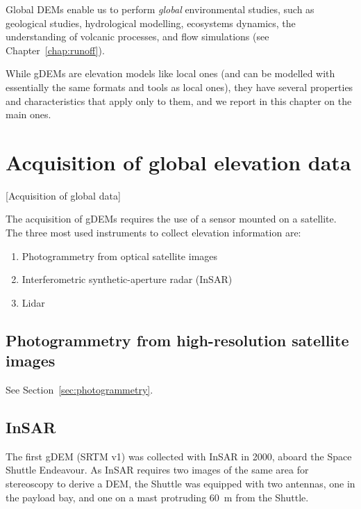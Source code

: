 %

Global DEMs enable us to perform \emph{global} environmental studies, such as geological studies, hydrological modelling, ecosystems dynamics, the understanding of volcanic processes, and flow simulations (see Chapter~\ref{chap:runoff}).

%

While gDEMs are elevation models like local ones (and can be modelled with essentially the same formats and tools as local ones), they have several properties and characteristics that apply only to them, and we report in this chapter on the main ones.



%
\section{Acquisition of global elevation data}[Acquisition of global data]

The acquisition of gDEMs requires the use of a sensor mounted on a satellite.
The three most used instruments to collect elevation information are:
\begin{enumerate}
  \item Photogrammetry from optical satellite images
  \item Interferometric synthetic-aperture radar (InSAR)
  \item Lidar
\end{enumerate}


\subsection{Photogrammetry from high-resolution satellite images}

See Section~\ref{sec:photogrammetry}.


\subsection{InSAR}%

The first gDEM (SRTM v1) was collected with InSAR in 2000, aboard the Space Shuttle Endeavour.
As InSAR requires two images of the same area for stereoscopy to derive a DEM, the Shuttle was equipped with two antennas, one in the payload bay, and one on a mast protruding \qty{60}{m} from the Shuttle.

